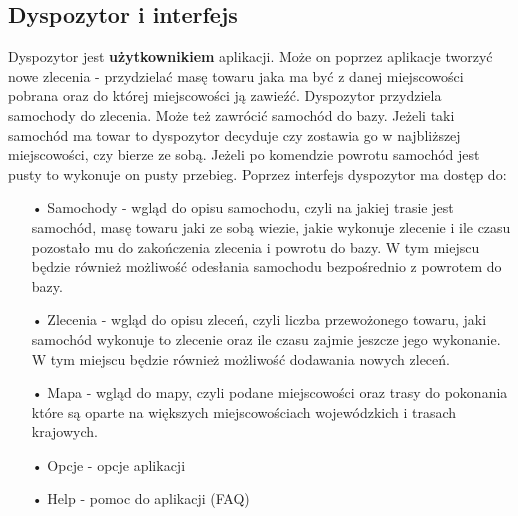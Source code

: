 \documentclass[11pt,a4paper]{mwart}
\begin{document}
\subsection{Dyspozytor i interfejs}
Dyspozytor jest \textbf{użytkownikiem} aplikacji. Może on poprzez aplikacje tworzyć nowe zlecenia - przydzielać masę towaru jaka ma być z danej miejscowości pobrana oraz do której miejscowości ją zawieźć. Dyspozytor przydziela samochody do zlecenia. Może też zawrócić samochód do bazy. Jeżeli taki samochód ma towar to dyspozytor decyduje czy zostawia go w najbliższej miejscowości, czy bierze ze sobą. Jeżeli po komendzie powrotu samochód jest pusty to wykonuje on pusty przebieg. 
Poprzez interfejs dyspozytor ma dostęp do:
\begin{flushleft}
\begin{enumerate}
\item[• Samochody] - wgląd do opisu samochodu, czyli na jakiej trasie jest samochód, masę towaru jaki ze sobą wiezie, jakie wykonuje zlecenie i ile czasu pozostało mu do zakończenia zlecenia i powrotu do bazy. W tym miejscu będzie również możliwość odesłania samochodu bezpośrednio z powrotem do bazy.
\item[• Zlecenia] - wgląd do opisu zleceń, czyli liczba przewożonego towaru, jaki samochód wykonuje to zlecenie oraz ile czasu zajmie jeszcze jego wykonanie. W tym miejscu będzie również możliwość dodawania nowych zleceń.
\item[• Mapa] - wgląd do mapy, czyli podane miejscowości oraz trasy do pokonania które są oparte na większych miejscowościach wojewódzkich i trasach krajowych.
\item[• Opcje] - opcje aplikacji
\item[• Help] - pomoc do aplikacji (FAQ)
\end{enumerate}
\end{flushleft}
\end{document}
